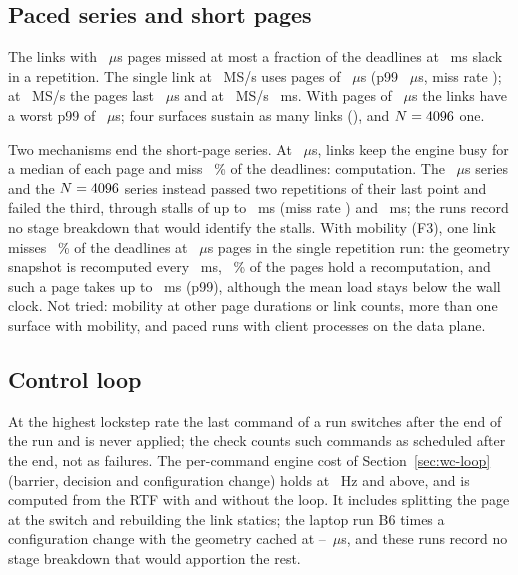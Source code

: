 \subsection{Paced series and short pages}
The \numBthreeOneLinks{} links with \numBthreeOnePageUs~$\mu$s pages missed
at most a fraction \numBthreeOneMiss{} of the deadlines at \numSustainSlackMs~ms slack in a
repetition. The single link at \numBthreeTopMsps~MS/s uses pages of
\numBthreeTopPageUs~$\mu$s (p99 \numBthreeTopPninetynineUs~$\mu$s, miss rate
\numBthreeTopMiss); at \numBthreeMidMsps~MS/s the pages last \numBthreeMidPageUs~$\mu$s and at
\numBthreeLowMsps~MS/s \numBthreeLowPageMs~ms. With pages of \numBthreeHalfPageUs~$\mu$s the
\numBthreeHalfLinks{} links have a worst p99 of \numBthreeHalfPninetynineUs~$\mu$s; four
surfaces sustain as many links (\numBthreeFourRisLinks), and $N=4096$ one.

Two mechanisms end the short-page series. At \numBthreeHalfPageUs~$\mu$s,
\numBthreeHalfFailLinks{} links keep the engine busy for a median \numBthreeHalfFailUtil{} of
each page and miss \numBthreeHalfFailMissPct~\% of the deadlines: computation. The
\numBthreeQuarterPageUs~$\mu$s series and the $N=4096$ series instead passed two
repetitions of their last point and failed the third, through stalls of up to
\numBthreeQuarterStallMs~ms (miss rate \numBthreeQuarterFailMiss) and
\numBthreeBigNStallMs~ms; the runs record no stage breakdown that would identify the stalls.
With mobility (F3), one link misses \numBthreeFthreeMissPct~\% of the deadlines at
\numBthreeHalfPageUs~$\mu$s pages in the single repetition run: the geometry snapshot is
recomputed every \numBthreeFthreeTuMs~ms, \numBthreeFthreeSnapPct~\% of the pages hold a
recomputation, and such a page takes up to \numBthreeFthreeUtilMs~ms (p99), although the mean
load stays below the wall clock. Not tried: mobility at other page durations or link counts,
more than one surface with mobility, and paced runs with client processes on the data plane.

\subsection{Control loop}
At the highest lockstep rate the last command of a run switches after the
end of the run and is never applied; the check counts such commands as scheduled after the end,
not as failures. The per-command engine cost of Section~\ref{sec:wc-loop} (barrier, decision and
configuration change) holds at \numBfourRateMidHz~Hz and above, and is computed from the RTF
with and without the loop. It includes splitting the page at the switch and rebuilding the
link statics; the laptop run B6 times a configuration change with the geometry cached at
\numBsixCombMinUs--\numBsixCombMaxUs~$\mu$s, and these runs record no stage breakdown that
would apportion the rest.

